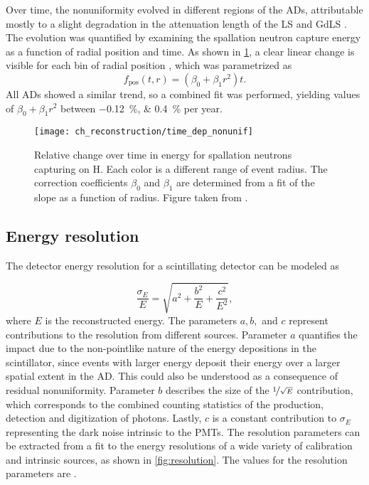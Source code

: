 Over time, the nonuniformity evolved in different regions of the ADs,
attributable mostly to a slight degradation in the attenuation length of the LS
and GdLS \cite{nonuniformity3}.
The evolution was quantified by examining the spallation neutron capture energy
as a function of radial position and time.
As shown in \cref{fig:time_dep_nonunif}, a clear linear change is visible
for each bin of radial position \cite{nonuniformity1}, which was parametrized as
\begin{equation}
    f_{\text{pos}}(t, r) = (\beta_0 + \beta_1r^2)t.
\end{equation}
All ADs showed a similar trend, so a combined fit was performed,
yielding values of $\beta_0 + \beta_1r^2$ between
\SIlist[retain-explicit-plus]{-0.12;+0.4}{\percent} per year.

\begin{figure}
    \centering
    \texttt{[image: ch\_reconstruction/time\_dep\_nonunif]}
    \caption{
        Relative change over time in energy for spallation neutrons capturing on H.
        Each color is a different range of event radius.
        The correction coefficients $\beta_0$ and $\beta_1$ are determined
        from a fit of the slope as a function of radius.
        Figure taken from \cite{nonuniformity4}.
    }
    \label{fig:time_dep_nonunif}
\end{figure}

\subsection{Energy resolution}
\label{subsec:resolution}

The detector energy resolution for a scintillating detector can be modeled as
\cite{energy_resolution}

\begin{equation}
    \frac{\sigma_E}{E} = \sqrt{a^2 + \frac{b^2}{E} + \frac{c^2}{E^2}},
\end{equation}
where $E$ is the reconstructed energy.
The parameters $a,b,$ and $c$ represent contributions to the resolution
from different sources.
Parameter $a$ quantifies the impact due to the non-pointlike nature
of the energy depositions in the scintillator,
since events with larger energy deposit their energy over a larger spatial extent
in the AD.
This could also be understood as a consequence of residual nonuniformity.
Parameter $b$ describes the size of the $\nicefrac{1}{\sqrt{E}}$ contribution,
which corresponds to the combined counting statistics of
the production, detection and digitization of photons.
Lastly, $c$ is a constant contribution to $\sigma_E$
representing the dark noise intrinsic to the PMTs.
The resolution parameters can be extracted from a fit
to the energy resolutions of a wide variety of calibration and intrinsic sources,
as shown in \cref{fig:resolution}.
The values for the resolution parameters are .

